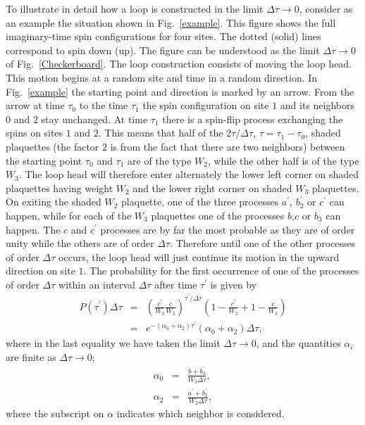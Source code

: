 \documentclass[10pt,pre,aps,twocolumn,showpacs,superscriptaddress,
floatfix]{revtex4}
\newcommand{\bea}{\begin{eqnarray}}
\newcommand{\eea}{\end{eqnarray}}
\newcommand{\f}{\frac}
\newcommand{\Deltatau}{\Delta \tau}
\begin{document}
To illustrate in detail how a loop is constructed in the limit $\Deltatau 
\to 0$, consider as an example the situation shown in Fig.~\ref{example}. 
This figure shows the full imaginary-time spin configurations for four sites. 
The dotted (solid) lines correspond to spin down (up). The figure can be 
understood as the limit $\Deltatau \to 0$ of Fig.~\ref{Checkerboard}.  
The loop construction consists of moving the loop head. This motion begins 
at a random site and time in a random direction. In Fig.~\ref{example} the 
starting point and direction is marked by an arrow. From the arrow at time 
$\tau_0$ to the time $\tau_1$ the spin configuration on site $1$ and its 
neighbors $0$ and $2$ stay unchanged. At time $\tau_1$ there is a spin-flip 
process exchanging the spins on sites $1$ and $2$. This means that half of 
the $2\tau /\Deltatau$, $\tau=\tau_1-\tau_0$, shaded plaquettes (the factor 
$2$ is from the fact that there are two neighbors) between the starting point 
$\tau_0$ and $\tau_1$ are of the type $W_2$, while the other half is of the 
type $W_3$. The loop head will therefore enter alternately the lower left 
corner on shaded plaquettes having weight $W_2$ and the lower right corner 
on shaded $W_3$ plaquettes. On exiting the shaded $W_2$ plaquette, one of 
the three processes $a^\prime$, $b^\prime_2$ or $c^\prime$ can happen, 
while for each of the $W_3$ plaquettes one of the processes $b$,$c$ or $b_3$ 
can happen. The $c$ and $c^\prime$ processes are by far the most probable 
as they are of order unity while the others are of order $\Deltatau$. 
Therefore until one of the other processes of order $\Deltatau$ occurs, 
the loop head will just continue its motion in the upward direction on 
site $1$. The probability for the first occurrence of one of the processes 
of order $\Deltatau$ within an interval $\Deltatau$ after time $\tau^\prime$ 
is given by
\bea
	P \left( \tau^\prime \right) \Deltatau 
	& = & \left( \f{c^\prime}{W_2} \f{c}{W_3}
	      \right)^{\tau^\prime/\Deltatau}
	  	\left( 1 - \f{c^\prime}{W_2}
	  	     + 1 - \f{c}{W_3} \right) \nonumber \\
	& = & e^{-(\alpha_{0} + \alpha_{2}) \tau^\prime} 
              (\alpha_{0}+\alpha_{2}) \Deltatau, \label{decayprob}
\eea
where in the last equality we have taken the limit $\Deltatau \to 0$, and
the quantities $\alpha_i$ are finite as $\Deltatau \to 0$;
\bea
	\alpha_{0} & = & \f{b+b^\prime_3}{W_3 \Deltatau}, \\
	\alpha_{2} & = & \f{a^\prime+b^\prime_2}{W_2 \Deltatau},
\eea
where the subscript on $\alpha$ indicates which neighbor is considered.
\end{document}
